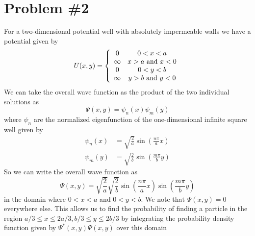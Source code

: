 \documentclass[11pt]{article}
\numberwithin{equation}{section}
\begin{document}
\section{Problem \#2}
For a two-dimensional potential well with absolutely impermeable walls we have a potential 
given by
$$U(x,y) = \left\{\begin{array}{ccc}
                 0       &0<x<a\\
                 \infty  &x>a \textnormal{\ and\ } x<0\\
                 0       &0<y<b\\
                 \infty  &y>b \textnormal{\ and\ } y<0\\
            \end{array}\right.$$
We can take the overall wave function as the product of the two individual solutions as
$$\Psi(x,y) = \psi_n(x)\psi_m(y)$$
where $\psi_n$ are the normalized eigenfunction of the one-dimensional infinite square well given by
\begin{align*}
\psi_n(x) &= \sqrt{\frac{2}{a}}\sin\left(\frac{n\pi}{a}x\right)\\
\psi_m(y) &= \sqrt{\frac{2}{b}}\sin\left(\frac{m\pi}{b}y\right)
\end{align*}
So we can write the overall wave function as
$$\Psi(x,y) = \sqrt{\frac{2}{a}}\sqrt{\frac{2}{b}}\sin\left(\frac{n\pi}{a}x\right)\sin\left(\frac{m\pi}{b}y\right)$$
in the domain where $0<x<a$ and $0<y<b$. We note that $\Psi(x,y)=0$ everywhere else. This
allows us to find the probability of finding a particle in the region $a/3\le{x}\le{2a/3}, 
b/3\le{y}\le{2b/3}$ by integrating the probability density function given by $\Psi^*(x,y)\Psi(x,y)$ 
over this domain
\end{document}
